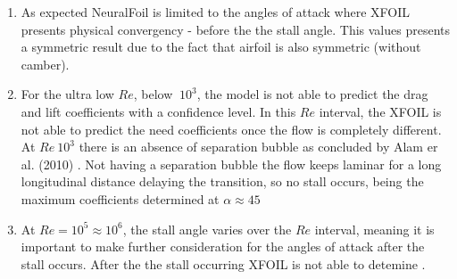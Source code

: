 \begin{enumerate}
    \item As expected NeuralFoil is limited to the angles of attack where XFOIL presents physical convergency - before the the stall angle. This values presents a symmetric result due to the fact that airfoil is also symmetric (without camber).
    
    \item For the ultra low $Re$, below $~ 10^3$, the model is not able to predict the drag and lift coefficients with a confidence level. In this $Re$ interval, the XFOIL is not able to predict the need coefficients once the flow is completely different. At $Re ~ 10^3$ there is an absence of separation bubble as  concluded by Alam er al. (2010) \cite{alam_ultra-low_2010}. Not having a separation bubble the flow keeps laminar for a long longitudinal distance delaying the transition, so no stall occurs, being the maximum coefficients determined at $\alpha \approx 45$ \unit{\deg}
    
    \item At $Re = 10^5 \approx 10^6$, the stall angle varies over the $Re$ interval, meaning it is important to make further consideration for the angles of attack after the stall occurs. After the the stall occurring XFOIL is not able to detemine  .

\end{enumerate}

